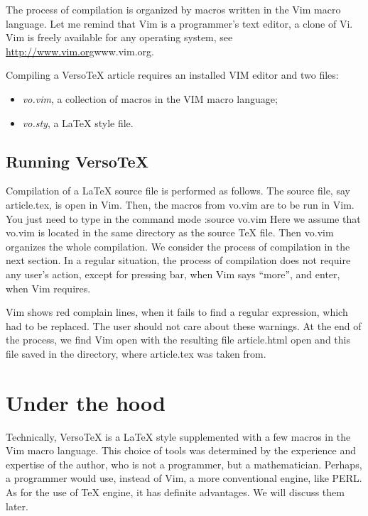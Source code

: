 \documentclass{article}
\begin{document}
The process of compilation is organized by macros written in the Vim macro
language. Let me remind that Vim is a programmer's text editor, a 
clone of Vi. Vim is freely available for any operating system, see
\url{http://www.vim.org}{www.vim.org}.

Compiling a VersoTeX article requires an installed  VIM editor 
and two files: 
\begin{itemize} 
\item {\em vo.vim}, a collection of macros in the VIM macro language;
\item {\em vo.sty}, a LaTeX style file.
\end{itemize}

\subsection{Running VersoTeX}\label{s2.3}
Compilation of a LaTeX source file is performed as follows. 
The source file, say article.tex, is open in Vim. Then, the macros
from vo.vim are to be run in Vim. You just need to type in the command mode\newline
:source vo.vim\newline
Here we assume that vo.vim is located in the same directory as the source
TeX file.
Then vo.vim organizes the whole compilation. We consider the process of
compilation in the next section. In a regular situation, the process of
compilation does not require any user's action, except for pressing 
bar, when Vim says ``more'', and enter, when Vim requires.  

Vim shows red complain lines, when it fails
to find a regular expression, which had to be replaced. The user should not
care about these warnings. 
At the end of the process,
we find Vim open with the resulting file article.html open and this file 
saved in the directory, where article.tex was taken from.
 
\section{Under the hood}\label{s3}
Technically, VersoTeX is a LaTeX style supplemented with a few 
macros in the Vim macro language. 
This choice of tools was determined by the experience and expertise of the
author, who is not a programmer, but a mathematician. 
Perhaps, a programmer would use, instead of Vim, a more conventional 
engine, like PERL. As for the use of TeX engine, it has definite advantages. 
We will discuss them later.
\end{document}
